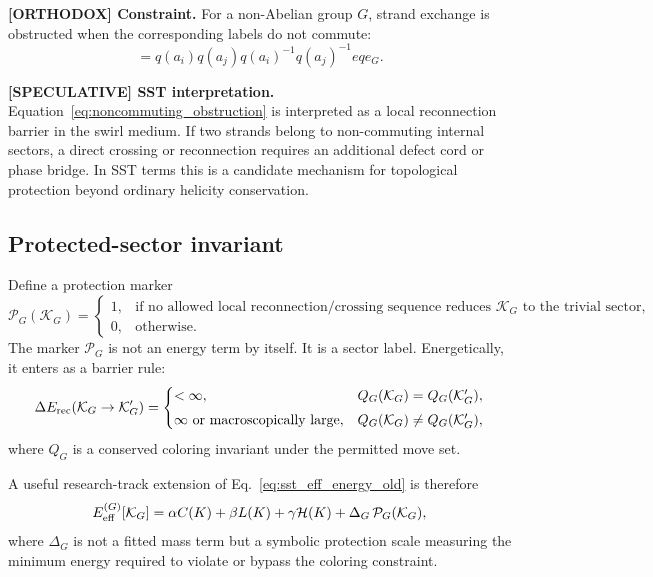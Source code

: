 \textbf{[ORTHODOX] Constraint.}
For a non-Abelian group $G$, strand exchange is obstructed when the corresponding labels do not commute:
\begin{equation}
    [q(a_i),q(a_j)]
    = q(a_i)q(a_j)q(a_i)^{-1}q(a_j)^{-1}
eq e_G.
    \label{eq:noncommuting_obstruction}
\end{equation}

\textbf{[SPECULATIVE] SST interpretation.}
Equation~\eqref{eq:noncommuting_obstruction} is interpreted as a local reconnection barrier in the swirl medium. If two strands belong to non-commuting internal sectors, a direct crossing or reconnection requires an additional defect cord or phase bridge. In SST terms this is a candidate mechanism for topological protection beyond ordinary helicity conservation.

\subsection{Protected-sector invariant}
Define a protection marker
\begin{equation}
    \mathcal P_G(\mathcal K_G)=
    \begin{cases}
        1, & \text{if no allowed local reconnection/crossing sequence reduces }\mathcal K_G\text{ to the trivial sector},\\[0.3em]
        0, & \text{otherwise.}
    \end{cases}
    \label{eq:protection_marker}
\end{equation}
The marker $\mathcal P_G$ is not an energy term by itself. It is a sector label. Energetically, it enters as a barrier rule:
\begin{equation}
    \Delta E_{\rm rec}(\mathcal K_G\rightarrow \mathcal K'_G)=
    \begin{cases}
        <\infty, & Q_G(\mathcal K_G)=Q_G(\mathcal K'_G),\\[0.3em]
        \infty \text{ or macroscopically large}, & Q_G(\mathcal K_G)\neq Q_G(\mathcal K'_G),
    \end{cases}
    \label{eq:nonabelian_barrier_rule}
\end{equation}
where $Q_G$ is a conserved coloring invariant under the permitted move set.

A useful research-track extension of Eq.~\eqref{eq:sst_eff_energy_old} is therefore
\begin{equation}
    E_{\rm eff}^{(G)}[\mathcal K_G]
    = \alpha C(K)+\beta L(K)+\gamma \mathcal H(K)
    + \Delta_G\,\mathcal P_G(\mathcal K_G),
    \label{eq:nonabelian_extended_energy}
\end{equation}
where $\Delta_G$ is not a fitted mass term but a symbolic protection scale measuring the minimum energy required to violate or bypass the coloring constraint.

